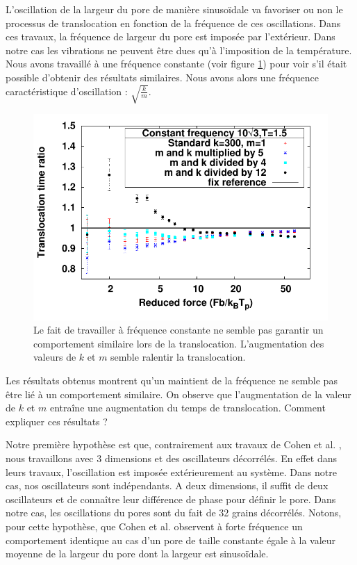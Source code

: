 L’oscillation de la largeur du pore de manière sinusoïdale va favoriser ou non le processus de translocation en fonction de la fréquence de ces oscillations. Dans ces travaux, la fréquence de largeur du pore est imposée par l'extérieur. Dans notre cas les vibrations ne peuvent être dues qu'à l'imposition de la température. Nous avons travaillé à une fréquence constante (voir figure \ref{influencefrequencecarac}) pour voir s'il était possible d'obtenir des résultats similaires. Nous avons alors une fréquence caractéristique d'oscillation : $\sqrt{\frac{k}{m}}$.







\begin{figure}[H]
\begin{center}
\includegraphics[width=\textwidth]{compsamefrequency.pdf} 

\caption[Influence de la fréquence des vibrations]{Le fait de travailler à fréquence constante ne semble pas garantir un comportement similaire lors de la translocation. L'augmentation des valeurs de $k$ et $m$ semble ralentir la translocation.}
\label{influencefrequencecarac}
\end{center}
\end{figure}

Les résultats obtenus montrent qu'un maintient de la fréquence ne semble pas être lié à un comportement similaire. On observe que l'augmentation de la valeur de $k$ et $m$ entraîne une augmentation du temps de translocation. Comment expliquer ces résultats ?

Notre première hypothèse est que, contrairement aux travaux de Cohen et al. \cite{Cohen2011}, nous travaillons avec 3 dimensions et des oscillateurs décorrélés. En effet dans leurs travaux, l'oscillation est imposée extérieurement au système. Dans notre cas, nos oscillateurs sont indépendants. A deux dimensions, il suffit de deux oscillateurs et de connaître leur différence de phase pour définir le pore. Dans notre cas, les oscillations du pores sont du fait de 32 grains décorrélés. Notons, pour cette hypothèse, que Cohen et al. \cite{Cohen2011} observent à forte fréquence un comportement identique au cas d'un pore de taille constante égale à la valeur moyenne de la largeur du pore dont la largeur est sinusoïdale.

